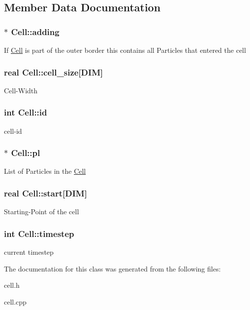 \subsection{Member Data Documentation}
\hypertarget{class_cell_a04cf5ce1a21a004d661ebbc5feac3781}{
\subsubsection[{adding}]{$\ast$ Cell\-::adding}}\label{class_cell_a04cf5ce1a21a004d661ebbc5feac3781}
If \hyperlink{class_cell}{Cell} is part of the outer border this contains all Particles that entered the cell \hypertarget{class_cell_aed68c826e1acd12d3df96f640e17140e}{
\subsubsection[{cell\-\_\-size}]{\setlength{\rightskip}{0pt plus 5cm}real Cell\-::cell\-\_\-size\mbox{[}D\-I\-M\mbox{]}}}\label{class_cell_aed68c826e1acd12d3df96f640e17140e}
Cell-\/\-Width \hypertarget{class_cell_a25f37241a10fa27bcdea7e939eea5efc}{
\subsubsection[{id}]{\setlength{\rightskip}{0pt plus 5cm}int Cell\-::id}}\label{class_cell_a25f37241a10fa27bcdea7e939eea5efc}
cell-\/id \hypertarget{class_cell_a747b00936db8b67a4a4c76553fd9f898}{
\subsubsection[{pl}]{$\ast$ Cell\-::pl}}\label{class_cell_a747b00936db8b67a4a4c76553fd9f898}
List of Particles in the \hyperlink{class_cell}{Cell} \hypertarget{class_cell_af8a3594281ee0ab62b3251c71321e028}{
\subsubsection[{start}]{\setlength{\rightskip}{0pt plus 5cm}real Cell\-::start\mbox{[}D\-I\-M\mbox{]}}}\label{class_cell_af8a3594281ee0ab62b3251c71321e028}
Starting-\/\-Point of the cell \hypertarget{class_cell_a2588fe181c8c613fa58687c4ec810fd2}{
\subsubsection[{timestep}]{\setlength{\rightskip}{0pt plus 5cm}int Cell\-::timestep}}\label{class_cell_a2588fe181c8c613fa58687c4ec810fd2}
current timestep 

The documentation for this class was generated from the following files\-:\begin{DoxyCompactItemize}
\item 
cell.\-h\item 
cell.\-cpp\end{DoxyCompactItemize}
